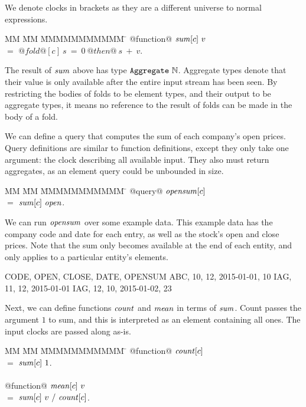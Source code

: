 We denote clocks in brackets as they are a different universe to normal expressions.
\begin{tabbing}
MM \= MM \= MMMMMMMMMMM \= \kill
@function@ 
$\mathit{sum}[c]~v$    \\
\> $=$  \> $@fold@[c]~s~=~0~@then@~s~+~v$. \\
\end{tabbing}

The result of $\mathit{sum}$ above has type $\mathtt{Aggregate}~\mathbb{N}$.
Aggregate types denote that their value is only available after the entire input stream has been seen.
By restricting the bodies of folds to be element types, and their output to be aggregate types, it means no reference to the result of folds can be made in the body of a fold.

We can define a query that computes the sum of each company's open prices.
Query definitions are similar to function definitions, except they only take one argument: the clock describing all available input.
They also must return aggregates, as an element query could be unbounded in size.
\begin{tabbing}
MM \= MM \= MMMMMMMMMMM \= \kill
@query@ 
$\mathit{opensum}[c]$    \\
\> $=$  \> $\mathit{sum}[c]~\mathit{open}$. \\
\end{tabbing}

We can run $\mathit{opensum}$ over some example data.
This example data has the company code and date for each entry, as well as the stock's open and close prices.
Note that the sum only becomes available at the end of each entity, and only applies to a particular entity's elements.

\begin{code}
CODE, OPEN, CLOSE, DATE,        OPENSUM
ABC,    10,    12, 2015-01-01,       10
IAG,    11,    12, 2015-01-01
IAG,    12,    10, 2015-01-02,       23
\end{code}


Next, we can define functions $\mathit{count}$ and $\mathit{mean}$ in terms of $\mathit{sum}$.
Count passes the argument $1$ to sum, and this is interpreted as an element containing all ones.
The input clocks are passed along as-is.
\begin{tabbing}
MM \= MM \= MMMMMMMMMMM \= \kill
@function@ 
$\mathit{count}[c]$                                     \\
 \> $=$  \> $\mathit{sum}[c]~1$.                           \\
                                                    \\
@function@ 
$\mathit{mean}[c]~v$                                       \\
 \> $=$  \> $\mathit{sum}[c]~v~/~\mathit{count}[c]$.              \\
\end{tabbing}

